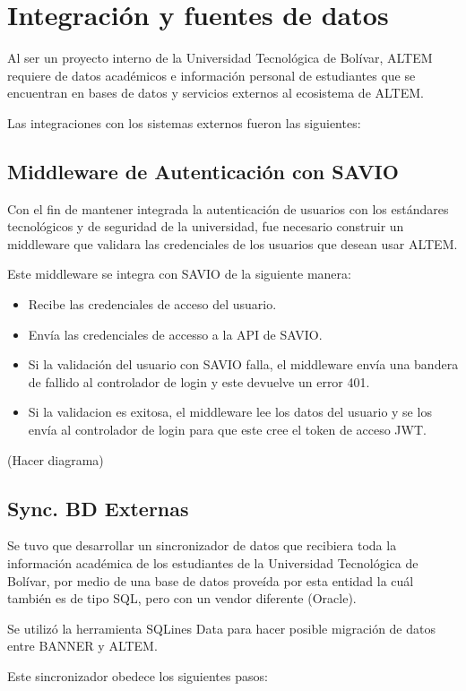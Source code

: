 \chapter{Integración y fuentes de datos}
Al ser un proyecto interno de la Universidad Tecnológica de Bolívar, ALTEM requiere de datos académicos e información personal de estudiantes que se encuentran en bases de datos y servicios externos al ecosistema de ALTEM.

Las integraciones con los sistemas externos fueron las siguientes:

\section{Middleware de Autenticación con SAVIO}
Con el fin de mantener integrada la autenticación de usuarios con los estándares tecnológicos y de seguridad de la universidad, fue necesario construir un middleware que validara las credenciales de los usuarios que desean usar ALTEM.

Este middleware se integra con SAVIO de la siguiente manera:
\begin{itemize}
    \item Recibe las credenciales de acceso del usuario.
    \item Envía las credenciales de accesso a la API de SAVIO.
    \item Si la validación del usuario con SAVIO falla, el middleware envía una bandera de fallido al controlador de login y este devuelve un error 401.
    \item Si la validacion es exitosa, el middleware lee los datos del usuario y se los envía al controlador de login para que este cree el token de acceso JWT.
\end{itemize}

(Hacer diagrama)

\section{Sync. BD Externas}
Se tuvo que desarrollar un sincronizador de datos que recibiera toda la información académica de los estudiantes de la Universidad Tecnológica de Bolívar, por medio de una base de datos proveída por esta entidad la cuál también es de tipo SQL, pero con un vendor diferente (Oracle).

Se utilizó la herramienta SQLines Data para hacer posible migración de datos entre BANNER y ALTEM. 

Este sincronizador obedece los siguientes pasos:


